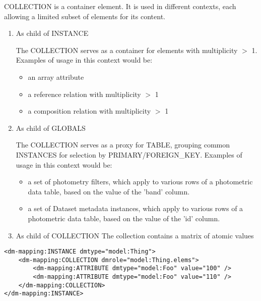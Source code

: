     COLLECTION is a container element.  It is used in different contexts, each allowing a limited subset of elements for its content. 

    \begin{enumerate}
    \item{As child of INSTANCE}
      
      The COLLECTION serves as a container for elements with multiplicity $>$ 1.\\
      Examples of usage in this context would be:
      \begin{itemize}
        \item an array attribute
        \item a reference relation with multiplicity $>$ 1
        \item a composition relation with multiplicity $>$ 1
      \end{itemize}
      
    \item{As child of GLOBALS}
          
      The COLLECTION serves as a proxy for TABLE, grouping common INSTANCES for selection by PRIMARY/FOREIGN\_KEY.
      Examples of usage in this context would be:
      \begin{itemize}
        \item a set of photometry filters, which apply to various rows of a photometric data table, based on the value of the 'band' column.
        \item a set of Dataset metadata instances, which apply to various rows of a photometric data table, based on the value of the 'id' column.
      \end{itemize}
          
    \item{As child of COLLECTION}
	The collection contains a matrix of  atomic values
        
    \end{enumerate}
   
\begin{lstlisting}[frame=single,caption={Example of COLLECTION child of INSTANCE},style=XML,basicstyle=\tiny]
<dm-mapping:INSTANCE dmtype="model:Thing">
    <dm-mapping:COLLECTION dmrole="model:Thing.elems">
        <dm-mapping:ATTRIBUTE dmtype="model:Foo" value="100" />
        <dm-mapping:ATTRIBUTE dmtype="model:Foo" value="110" />
    </dm-mapping:COLLECTION>
</dm-mapping:INSTANCE>
\end{lstlisting}   

